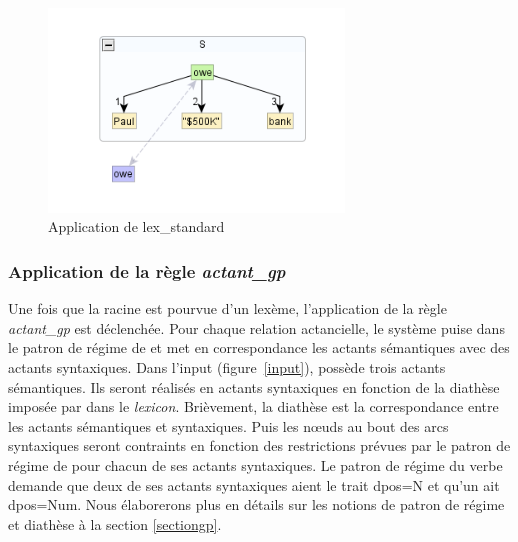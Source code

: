 \begin{figure}[htb]
	\centering
	\includegraphics[width=0.7\textwidth, trim = {0cm 0cm 0cm 0cm},clip]{ch3/figs/lex_standard_root.png}
		\vspace{-0.5cm}
	\caption{Application de lex\_standard}
	\label{fig:lexstand1}
\end{figure}

\subsubsection{Application de la règle \emph{actant\_gp}}
Une fois que la racine est pourvue d'un lexème, l'application de la règle \emph{actant\_gp} est déclenchée. Pour chaque relation actancielle, le système puise dans le patron de régime de  et met en correspondance les actants sémantiques avec des actants syntaxiques. Dans l'input (figure~\ref{input}),  possède trois actants sémantiques. Ils seront réalisés en actants syntaxiques en fonction de la diathèse imposée par  dans le \emph{lexicon}. Brièvement, la diathèse est la correspondance entre les actants sémantiques et syntaxiques. Puis les n\oe{}uds au bout des arcs syntaxiques seront contraints en fonction des restrictions prévues par le patron de régime de  pour chacun de ses actants syntaxiques. Le patron de régime du verbe demande que deux de ses actants syntaxiques aient le trait dpos=N et qu'un ait dpos=Num. Nous élaborerons plus en détails sur les notions de patron de régime et diathèse à la section \ref{sectiongp}. 

